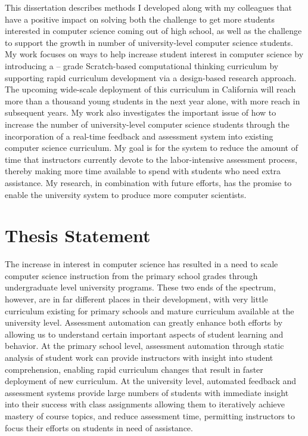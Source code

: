 This dissertation describes methods I developed along with my colleagues that
have a positive impact on solving both the challenge to get more students
interested in computer science coming out of high school, as well as the
challenge to support the growth in number of university-level computer science
students. My work focuses on ways to help increase student interest in computer
science by introducing a -- grade Scratch-based computational
thinking curriculum by supporting rapid curriculum development via a
design-based research approach. The upcoming wide-scale deployment of this
curriculum in California will reach more than a thousand young students in the
next year alone, with more reach in subsequent years. My work also investigates
the important issue of how to increase the number of university-level computer
science students through the incorporation of a real-time feedback and
assessment system into existing computer science curriculum. My goal is for the
system to reduce the amount of time that instructors currently devote to the
labor-intensive assessment process, thereby making more time available to spend
with students who need extra assistance. My research, in combination with
future efforts, has the promise to enable the university system to produce more
computer scientists.

\section{Thesis Statement}
The increase in interest in computer science has resulted in a need to scale
computer science instruction from the primary school grades through
undergraduate level university programs. These two ends of the spectrum,
however, are in far different places in their development, with very little
curriculum existing for primary schools and mature curriculum available at the
university level. Assessment automation can greatly enhance both efforts by
allowing us to understand certain important aspects of student learning and
behavior. At the primary school level, assessment automation through static
analysis of student work can provide instructors with insight into student
comprehension, enabling rapid curriculum changes that result in faster
deployment of new curriculum. At the university level, automated feedback and
assessment systems provide large numbers of students with immediate insight
into their success with class assignments allowing them to iteratively achieve
mastery of course topics, and reduce assessment time, permitting instructors to
focus their efforts on students in need of assistance.

